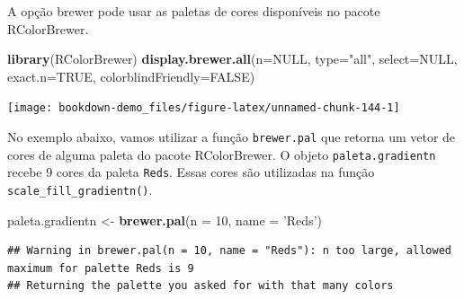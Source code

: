 \documentclass[]{book}
\newenvironment{Shaded}{\begin{snugshade}}{\end{snugshade}}
\newcommand{\KeywordTok}[1]{\textcolor[rgb]{0.13,0.29,0.53}{\textbf{#1}}}
\newcommand{\DataTypeTok}[1]{\textcolor[rgb]{0.13,0.29,0.53}{#1}}
\newcommand{\DecValTok}[1]{\textcolor[rgb]{0.00,0.00,0.81}{#1}}
\newcommand{\StringTok}[1]{\textcolor[rgb]{0.31,0.60,0.02}{#1}}
\newcommand{\OtherTok}[1]{\textcolor[rgb]{0.56,0.35,0.01}{#1}}
\newcommand{\OperatorTok}[1]{\textcolor[rgb]{0.81,0.36,0.00}{\textbf{#1}}}
\newcommand{\NormalTok}[1]{#1}
\begin{document}
A opção brewer pode usar as paletas de cores disponíveis no pacote
RColorBrewer.

\begin{Shaded}
\begin{Highlighting}[]
\KeywordTok{library}\NormalTok{(RColorBrewer)}
\KeywordTok{display.brewer.all}\NormalTok{(}\DataTypeTok{n=}\OtherTok{NULL}\NormalTok{, }\DataTypeTok{type=}\StringTok{"all"}\NormalTok{, }\DataTypeTok{select=}\OtherTok{NULL}\NormalTok{, }\DataTypeTok{exact.n=}\OtherTok{TRUE}\NormalTok{,}
                                 \DataTypeTok{colorblindFriendly=}\OtherTok{FALSE}\NormalTok{)}
\end{Highlighting}
\end{Shaded}

\begin{center}\texttt{[image: bookdown-demo\_files/figure-latex/unnamed-chunk-144-1]} \end{center}

No exemplo abaixo, vamos utilizar a função \texttt{brewer.pal} que
retorna um vetor de cores de alguma paleta do pacote RColorBrewer. O
objeto \texttt{paleta.gradientn} recebe 9 cores da paleta \texttt{Reds}.
Essas cores são utilizadas na função \texttt{scale\_fill\_gradientn()}.

\begin{Shaded}
\begin{Highlighting}[]
\NormalTok{paleta.gradientn <-}\StringTok{ }\KeywordTok{brewer.pal}\NormalTok{(}\DataTypeTok{n =} \DecValTok{10}\NormalTok{, }\DataTypeTok{name =} \StringTok{'Reds'}\NormalTok{)}
\end{Highlighting}
\end{Shaded}

\begin{verbatim}
## Warning in brewer.pal(n = 10, name = "Reds"): n too large, allowed maximum for palette Reds is 9
## Returning the palette you asked for with that many colors
\end{verbatim}

\begin{Shaded}
\end{Shaded}
\end{document}
